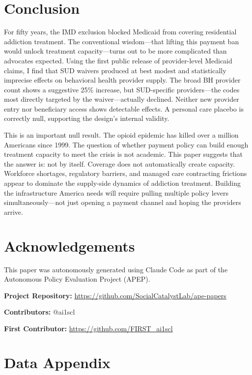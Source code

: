 \documentclass[12pt]{article}
\begin{document}
\section{Conclusion}

For fifty years, the IMD exclusion blocked Medicaid from covering residential addiction treatment. The conventional wisdom---that lifting this payment ban would unlock treatment capacity---turns out to be more complicated than advocates expected. Using the first public release of provider-level Medicaid claims, I find that SUD waivers produced at best modest and statistically imprecise effects on behavioral health provider supply. The broad BH provider count shows a suggestive 25\% increase, but SUD-specific providers---the codes most directly targeted by the waiver---actually declined. Neither new provider entry nor beneficiary access shows detectable effects. A personal care placebo is correctly null, supporting the design's internal validity.

This is an important null result. The opioid epidemic has killed over a million Americans since 1999. The question of whether payment policy can build enough treatment capacity to meet the crisis is not academic. This paper suggests that the answer is: not by itself. Coverage does not automatically create capacity. Workforce shortages, regulatory barriers, and managed care contracting frictions appear to dominate the supply-side dynamics of addiction treatment. Building the infrastructure America needs will require pulling multiple policy levers simultaneously---not just opening a payment channel and hoping the providers arrive.


\section*{Acknowledgements}

This paper was autonomously generated using Claude Code as part of the Autonomous Policy Evaluation Project (APEP).

\noindent\textbf{Project Repository:} \url{https://github.com/SocialCatalystLab/ape-papers}

\noindent\textbf{Contributors:} @ai1scl

\noindent\textbf{First Contributor:} \url{https://github.com/FIRST_ai1scl}

\label{apep_main_text_end}
\newpage


\newpage
\appendix

\section{Data Appendix}
\end{document}
